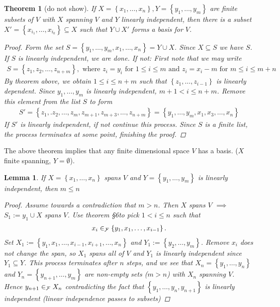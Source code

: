 \documentclass[10pt,twoside,openany,final]{memoir}
\theoremstyle{break}
\newtheorem{theorem}[section]{Theorem}
\newtheorem{lemma}[section]{Lemma}
\theoremstyle{Break}
\newcommand{\F}{\mathcal{F}}
\let\Span\relax
\DeclareMathOperator{\Span}{Span}
\begin{document}
\begin{theorem}[do not show]
	If $X=\left\{ x_1,\dots,x_n \right\}, Y=\left\{ y_1,\dots,y_m \right\}$ are finite subsets of $V$ with $X$ spanning $V$ and $Y$ linearly independent, then there is a subset $X'=\left\{ x_{i_1},\dots,x_{i_k} \right\} \subseteq X$ such that $Y \cup X'$ forms a basis for $V$.
\begin{proof}
Form the set $S= \left\{ y_1,\dots,y_m, x_1,\dots,x_n \right\}= Y \cup X$. Since $X \subseteq S$ we have $S$. If $S$ is linearly independent, we are done. If not: First note that we may write 
\begin{align*}
	S=\left\{ z_1,z_2,\dots,z_{n+m} \right\}, \text{ where } z_i=y_i \text{ for } 1 \leq i \leq m \text{ and } z_i= x_i-m \text{ for } m \leq i \leq m+n
\end{align*}
By theorem above, we obtain $1 \leq i \leq n+m$ such that $\left\{ z_1,\dots,z_{i-1} \right\}$ is linearly dependent. Since $y_1,\dots,y_m$ is linearly independent, $m+1 < i  \leq n+m$. Remove this element from the list $S$ to form 
\begin{align*}
	S' = \left\{ z_1,.z_2,\dots,z_m,z_{m+1}, z_{m+3},\dots,z_{n+m} \right\}= \left\{ y_1,\dots,y_m,x_1,x_3,\dots,x_n \right\}
\end{align*}
If $S'$ is linearly independent, if not continue this process. Since $S$ is a finite list, the process terminates at some point, finishing the proof.
\end{proof}
\end{theorem}
The above theorem implies that any finite dimensional space $V$ has a basis. ($X$ finite spanning, $Y=\emptyset$).


\begin{lemma}
	If $X=\left\{ x_1,\dots,x_n \right\}$ spans $V$ and $Y=\left\{ y_1,\dots,y_m \right\}$ is linearly independent, then $m \leq n$
\begin{proof}
Assume towards a contradiction that $ m>n$. Then $X$ spans $V$ $\implies$ $S_1:={y_1} \cup X$ spans $V$. Use theorem §6to pick $ 1 <i \leq n$ such that 
\begin{align*}
	x_i \in \Span_{\F}\left\{ y_1,x_1,\dots,x_{i-1}\right\}.
\end{align*}
Set $X_1:=\left\{ y_1,x_1,\dots,x_{i-1},x_{i+1},\dots,x_n \right\}$ and $Y_{1}:=\left\{ y_2,\dots,y_m \right\}$. Remove $x_i$ does not change the span, so $X_1$ spans all of $V$ and $Y_1$ is linearly independent since $Y_1 \subseteq Y$. This process terminates after $n$ steps, and we see that $X_n=\left\{ y_1,\dots,y_n \right\}$ and $Y_{n}=\left\{ y_{n+1},\dots,y_m \right\}$ are non-empty sets ($m > n$) with $X_n$ spanning $V$. Hence $y_{n+1} \in \Span_{\F}X_n$ contradicting the fact that $\left\{ y_1,\dots,y_n,y_{n+1} \right\}$ is linearly independent (linear independence passes to subsets)
\end{proof}
\end{lemma}
\end{document}
